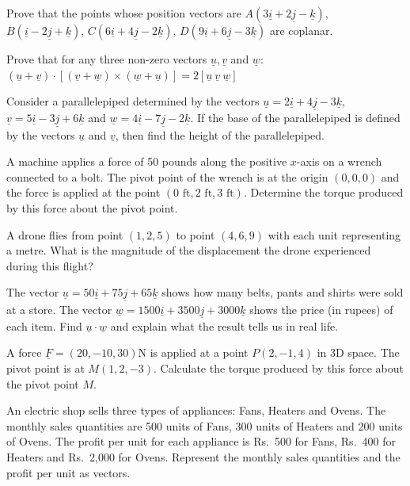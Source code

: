 \documentclass[11pt,a4paper]{article}
\begin{document}
\begin{longlist}
\item Prove that the points whose position vectors are $A(3\underline{i}+2\underline{j}-\underline{k})$, $B(\underline{i}-2\underline{j}+\underline{k})$, $C(6\underline{i}+4\underline{j}-2\underline{k})$, $D(9\underline{i}+6\underline{j}-3\underline{k})$ are coplanar.

\item Prove that for any three non-zero vectors $\underline{u},\underline{v}$ and $\underline{w}$: $(\underline{u}+\underline{v})\cdot[(\underline{v}+\underline{w})\times(\underline{w}+\underline{u})]=2[\underline{u}\ \underline{v}\ \underline{w}]$

\item Consider a parallelepiped determined by the vectors $\underline{u}=2\underline{i}+4\underline{j}-3\underline{k}$, $\underline{v}=5\underline{i}-3\underline{j}+6\underline{k}$ and $\underline{w}=4\underline{i}-7\underline{j}-2\underline{k}$. If the base of the parallelepiped is defined by the vectors $\underline{u}$ and $\underline{v}$, then find the height of the parallelepiped.

\item A machine applies a force of 50 pounds along the positive $x$-axis on a wrench connected to a bolt. The pivot point of the wrench is at the origin $(0,0,0)$ and the force is applied at the point $(0\text{ ft}, 2\text{ ft}, 3\text{ ft})$. Determine the torque produced by this force about the pivot point.

\item A drone flies from point $(1,2,5)$ to point $(4,6,9)$ with each unit representing a metre. What is the magnitude of the displacement the drone experienced during this flight?

\item The vector $\underline{u}=50\underline{i}+75\underline{j}+65\underline{k}$ shows how many belts, pants and shirts were sold at a store. The vector $\underline{w}=1500\underline{i}+3500\underline{j}+3000\underline{k}$ shows the price (in rupees) of each item. Find $\underline{u}\cdot\underline{w}$ and explain what the result tells us in real life.

\item A force $\underline{F}=(20,-10,30)$N is applied at a point $P(2,-1,4)$ in 3D space. The pivot point is at $M(1,2,-3)$. Calculate the torque produced by this force about the pivot point $M$.

\item An electric shop sells three types of appliances: Fans, Heaters and Ovens. The monthly sales quantities are 500 units of Fans, 300 units of Heaters and 200 units of Ovens. The profit per unit for each appliance is Rs.\ 500 for Fans, Rs.\ 400 for Heaters and Rs.\ 2{,}000 for Ovens. Represent the monthly sales quantities and the profit per unit as vectors.


\end{longlist}
\end{document}
